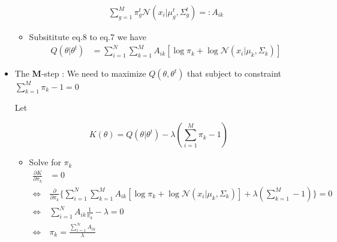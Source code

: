 \begin{itemize}
\begin{itemize}
\begin{equation}
\begin{aligned}
{						}{
							\sum_{g=1}^M {
								\pi_g^t \mathcal{N}(x_i | \mu_g^t, \Sigma_g^t)
							}
						} =: A_{ik}
					\end{aligned}
				\end{equation}
			\item Subsititute eq.8 to eq.7 we have 
				\begin{equation}
					\begin{aligned}
						Q(\theta | \theta^t) & = \sum_{i = 1}^N {
							\sum_{k=1}^M {
								A_{ik} [\log \pi_k + \log \mathcal{N}(x_i | \mu_k, \Sigma_k) ]
							}
						}
					\end{aligned}
				\end{equation}
		\end{itemize}




	\item The \textbf{M}-step : We need to maximize $Q(\theta, \theta^t)$ that subject to constraint $\sum_{k=1}^M \pi_k - 1 = 0$

Let

\begin{equation}
	K(\theta) = Q(\theta | \theta^t) - \lambda (\sum_{i = 1}^M \pi_k - 1) 
\end{equation}

		\begin{itemize}
			\item Solve for $\pi_k$
				\begin{equation}
					\begin{aligned}
						\frac{\partial K}{\partial \pi_k} & = 0 \\
						\iff & \frac{\partial}{\partial \pi_k}\bigg\{\sum_{i=1}^N{
							\sum_{k=1}^M {
								A_{ik} [ 
									\log \pi_k
									+ \log \mathcal{N}(x_i | \mu_k, \Sigma_k)
								]
							}
						} +  \lambda(\sum_{k = 1}^M - 1)  
						\bigg \} = 0 \\
						\iff & \sum_{i=1}^N {
							A_{ik} \frac{1}{\pi_k}
						} -\lambda = 0 \\
						\iff & \pi_k= \frac{\sum_{i=1}^N{A_{ik}}}{\lambda}
					\end{aligned}
				\end{equation}


\end{itemize}
\end{itemize}
